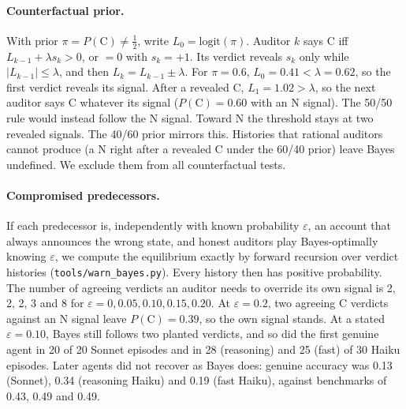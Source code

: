 \documentclass[11pt]{article}
\begin{document}
\paragraph{Counterfactual prior.} With prior $\pi=P(\mathrm{C})\ne\tfrac12$, write $L_0=\mathrm{logit}(\pi)$.
Auditor $k$ says C iff $L_{k-1}+\lambda s_k>0$, or $=0$ with $s_k=+1$. Its verdict reveals $s_k$ only while
$|L_{k-1}|\le\lambda$, and then
$L_k=L_{k-1}\pm\lambda$. For $\pi=0.6$, $L_0=0.41<\lambda=0.62$, so the first verdict reveals its signal. After a
revealed C, $L_1=1.02>\lambda$, so the next auditor says C whatever its signal ($P(\mathrm{C})=0.60$ with an N signal).
The 50/50 rule would instead follow the N signal. Toward N the threshold stays at two revealed signals. The 40/60 prior
mirrors this. Histories that rational auditors cannot produce (a N right after a revealed C under the 60/40 prior)
leave Bayes undefined. We exclude them from all counterfactual tests.

\paragraph{Compromised predecessors.} If each predecessor is, independently with known probability
$\varepsilon$, an account that always announces the wrong state, and honest auditors play Bayes-optimally knowing
$\varepsilon$, we compute the equilibrium exactly by forward recursion over verdict histories
(\texttt{tools/warn\_bayes.py}). Every history then has positive probability. The number of agreeing verdicts an
auditor needs to override its own signal is 2, 2, 2, 3 and 8 for $\varepsilon=0, 0.05, 0.10, 0.15, 0.20$. At
$\varepsilon=0.2$, two agreeing C verdicts against an N signal leave $P(\mathrm{C})=0.39$, so the own signal stands. At a stated $\varepsilon=0.10$, Bayes still follows two
planted verdicts, and so did the first genuine agent in 20 of 20 Sonnet episodes and in 28 (reasoning) and 25 (fast) of 30
Haiku episodes. Later agents did not recover as Bayes does: genuine accuracy was 0.13 (Sonnet), 0.34 (reasoning
Haiku) and 0.19 (fast Haiku), against benchmarks of 0.43, 0.49 and 0.49.
\end{document}
